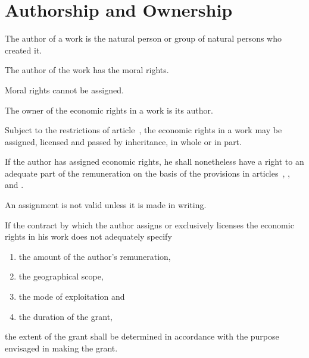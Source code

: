 \section{Authorship and Ownership}
\begin{contract}

\label{Par:Authorship}
\Sentence The author of a work is the natural person or group of natural persons who
created it.

\label{Par:MoralRights}
\Sentence The author of the work has the moral rights.

\Sentence Moral rights cannot be assigned.

\label{Par:EconomicRights}
\Sentence The owner of the economic rights in a work is its author.

\Sentence  Subject to the restrictions of article~, the economic rights in a work may
be assigned, licensed and passed by inheritance, in whole or in part.

\Sentence If the author has assigned economic rights, he shall nonetheless have a right to an adequate part of the remuneration on the basis of the
provisions in articles~, ,  and .

\Sentence An assignment is not valid unless it is made in writing.

\label{Par:Limits}
\Sentence If the contract by which the author assigns or exclusively licenses the
economic rights in his work does not adequately specify 
\begin{enumerate}[nolistsep,label=\alph*.,labelindent=1em,labelsep=*,align=left,beginpenalty=10000,endpenalty=10000]
	\item the amount of the author's remuneration, 
	\item the geographical scope, 
	\item the mode of exploitation and 
	\item the duration of the grant, 
\end{enumerate}
the extent of the grant shall be determined
in accordance with the purpose envisaged in making the grant.


\end{contract}
